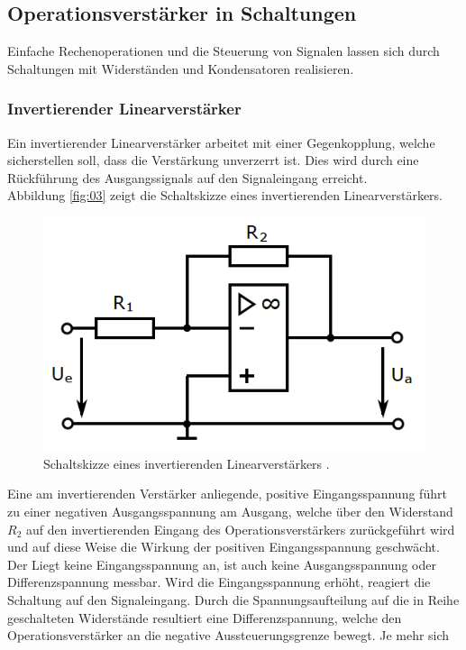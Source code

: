 \subsection{Operationsverstärker in Schaltungen}
Einfache Rechenoperationen und die Steuerung von Signalen lassen sich durch
Schaltungen mit Widerständen und Kondensatoren realisieren.
\subsubsection{Invertierender Linearverstärker}
Ein invertierender Linearverstärker arbeitet mit einer Gegenkopplung, welche
sicherstellen soll, dass die Verstärkung unverzerrt ist. Dies wird durch eine
Rückführung des Ausgangssignals auf den Signaleingang erreicht. \\
Abbildung \autoref{fig:03} zeigt die Schaltskizze eines invertierenden
Linearverstärkers.
\begin{figure}
  \centering
  \includegraphics[scale=0.5]{ressources/figure_03.png}
  \caption{Schaltskizze eines invertierenden Linearverstärkers \cite{sample}.}
  \label{fig:03}
\end{figure}
\noindent Eine am invertierenden Verstärker anliegende, positive Eingangsspannung
führt zu einer negativen Ausgangsspannung am Ausgang, welche über den Widerstand
$R_2$ auf den invertierenden Eingang des Operationsverstärkers zurückgeführt
wird und auf diese Weise die Wirkung der positiven Eingangsspannung geschwächt.
Der Liegt keine Eingangsspannung an, ist auch keine Ausgangsspannung oder
Differenzspannung messbar. Wird die Eingangsspannung erhöht, reagiert die Schaltung
auf den Signaleingang. Durch die Spannungsaufteilung auf die in Reihe
geschalteten Widerstände resultiert eine Differenzspannung, welche den
Operationsverstärker an die negative Aussteuerungsgrenze bewegt. Je mehr sich
